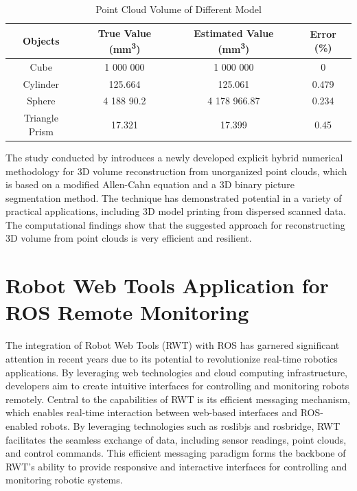 \begin{table}[H]
	\caption{Point Cloud Volume of Different Model}
	\label{tab:Point Cloud Volume of Different Objects}
	\centering
	\begin{tabular}{|c|c|c|c|}
		\hline
		Objects        & True Value (\si{mm^3}) & Estimated Value (\si{mm^3}) & Error (\%) \\
		\hline
		Cube           & 1 000 000              & 1 000 000                   & 0          \\
		\hline
		Cylinder       & 125.664                & 125.061                     & 0.479      \\
		\hline
		Sphere         & 4 188 90.2             & 4 178 966.87                & 0.234      \\
		\hline
		Triangle Prism & 17.321                 & 17.399                      & 0.45       \\
		\hline
	\end{tabular}
\end{table}

The study conducted by \citet{jeong2018} introduces a newly developed explicit hybrid numerical methodology for 3D volume reconstruction from unorganized point clouds, which is based on a modified Allen-Cahn equation and a 3D binary picture segmentation method. The technique has demonstrated potential in a variety of practical applications, including 3D model printing from dispersed scanned data. The computational findings show that the suggested approach for reconstructing 3D volume from point clouds is very efficient and resilient.

\section{Robot Web Tools Application for ROS Remote Monitoring}

The integration of Robot Web Tools (RWT) with ROS has garnered significant attention in recent years due to its potential to revolutionize real-time robotics applications. By leveraging web technologies and cloud computing infrastructure, developers aim to create intuitive interfaces for controlling and monitoring robots remotely. Central to the capabilities of RWT is its efficient messaging mechanism, which enables real-time interaction between web-based interfaces and ROS-enabled robots. By leveraging technologies such as roslibjs and rosbridge, RWT facilitates the seamless exchange of data, including sensor readings, point clouds, and control commands. This efficient messaging paradigm forms the backbone of RWT's ability to provide responsive and interactive interfaces for controlling and monitoring robotic systems.

